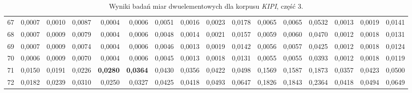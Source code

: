 \begin{table}[htp!]
\begin{adjustwidth}{-2cm}{}
\begin{tabular}{ l | *{15}{| r}}
67	&	0,0007	&	0,0010	&	0,0087	&	0,0004	&	0,0006	&	0,0051	&	0,0016	&	0,0023	&	0,0178	&	0,0065	&	0,0065	&	0,0532	&	0,0013	&	0,0019	&	0,0141	\\
68	&	0,0007	&	0,0009	&	0,0079	&	0,0004	&	0,0006	&	0,0048	&	0,0014	&	0,0021	&	0,0157	&	0,0059	&	0,0060	&	0,0470	&	0,0012	&	0,0018	&	0,0131	\\
69	&	0,0007	&	0,0009	&	0,0074	&	0,0004	&	0,0006	&	0,0046	&	0,0013	&	0,0019	&	0,0142	&	0,0056	&	0,0057	&	0,0425	&	0,0012	&	0,0018	&	0,0124	\\
70	&	0,0006	&	0,0009	&	0,0070	&	0,0004	&	0,0006	&	0,0045	&	0,0013	&	0,0018	&	0,0131	&	0,0055	&	0,0055	&	0,0393	&	0,0012	&	0,0018	&	0,0119	\\
71	&	0,0150	&	0,0191	&	0,0226	&	\textbf{0,0280}	&	\textbf{0,0364}	&	0,0430	&	0,0356	&	0,0422	&	0,0498	&	0,1569	&	0,1587	&	0,1873	&	0,0357	&	0,0423	&	0,0500	\\
72	&	0,0182	&	0,0239	&	0,0310	&	0,0250	&	0,0327	&	0,0425	&	0,0418	&	0,0493	&	0,0647	&	0,1826	&	0,1843	&	0,2364	&	0,0418	&	0,0494	&	0,0649	\\
	\bottomrule
\end{tabular}
 \end{adjustwidth}
\caption[Wyniki badań miar dwuelementowych dla korpusu \emph{KIPI}, część 3]{Wyniki badań miar dwuelementowych dla korpusu \emph{KIPI}, część 3.}
\label{KIPI_part_3}
\end{table}

